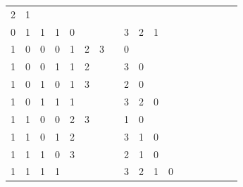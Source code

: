 \begin{table}[htbp]
\begin{minipage}{.4\textwidth}
\begin{tabular}{cccccccccccccccccc}
			\multicolumn{1}{c}{2} & \multicolumn{1}{c}{1} & \multicolumn{1}{c}{}& \multicolumn{1}{c}{} \\
			\multicolumn{1}{c}{0} & \multicolumn{1}{c}{1} & \multicolumn{1}{c}{1} & \multicolumn{1}{c}{1} & \multicolumn{1}{|c}{0} & \multicolumn{1}{c}{} & \multicolumn{1}{c}{}& \multicolumn{1}{c}{} &
			\multicolumn{1}{c}{3} & \multicolumn{1}{c}{2} & \multicolumn{1}{c}{1}& \multicolumn{1}{c}{} \\
			\multicolumn{1}{c}{1} & \multicolumn{1}{c}{0} & \multicolumn{1}{c}{0} & \multicolumn{1}{c}{0} & \multicolumn{1}{|c}{1} & \multicolumn{1}{c}{2} & \multicolumn{1}{c}{3}& \multicolumn{1}{c}{} &
			\multicolumn{1}{c}{0} & \multicolumn{1}{c}{} & \multicolumn{1}{c}{}& \multicolumn{1}{c}{} \\
			\multicolumn{1}{c}{1} & \multicolumn{1}{c}{0} & \multicolumn{1}{c}{0} & \multicolumn{1}{c}{1} & \multicolumn{1}{|c}{1} & \multicolumn{1}{c}{2} & \multicolumn{1}{c}{}& \multicolumn{1}{c}{} &
			\multicolumn{1}{c}{3} & \multicolumn{1}{c}{0} & \multicolumn{1}{c}{}& \multicolumn{1}{c}{} \\
			\multicolumn{1}{c}{1} & \multicolumn{1}{c}{0} & \multicolumn{1}{c}{1} & \multicolumn{1}{c}{0} & \multicolumn{1}{|c}{1} & \multicolumn{1}{c}{3} & \multicolumn{1}{c}{}& \multicolumn{1}{c}{} &
			\multicolumn{1}{c}{2} & \multicolumn{1}{c}{0} & \multicolumn{1}{c}{}& \multicolumn{1}{c}{} \\
			\multicolumn{1}{c}{1} & \multicolumn{1}{c}{0} & \multicolumn{1}{c}{1} & \multicolumn{1}{c}{1} & \multicolumn{1}{|c}{1} & \multicolumn{1}{c}{} & \multicolumn{1}{c}{}& \multicolumn{1}{c}{} &
			\multicolumn{1}{c}{3} & \multicolumn{1}{c}{2} & \multicolumn{1}{c}{0}& \multicolumn{1}{c}{} \\
			\multicolumn{1}{c}{1} & \multicolumn{1}{c}{1} & \multicolumn{1}{c}{0} & \multicolumn{1}{c}{0} & \multicolumn{1}{|c}{2} & \multicolumn{1}{c}{3} & \multicolumn{1}{c}{}& \multicolumn{1}{c}{} &
			\multicolumn{1}{c}{1} & \multicolumn{1}{c}{0} & \multicolumn{1}{c}{}& \multicolumn{1}{c}{} \\
			\multicolumn{1}{c}{1} & \multicolumn{1}{c}{1} & \multicolumn{1}{c}{0} & \multicolumn{1}{c}{1} & \multicolumn{1}{|c}{2} & \multicolumn{1}{c}{} & \multicolumn{1}{c}{}& \multicolumn{1}{c}{} &
			\multicolumn{1}{c}{3} & \multicolumn{1}{c}{1} & \multicolumn{1}{c}{0}& \multicolumn{1}{c}{} \\
			\multicolumn{1}{c}{1} & \multicolumn{1}{c}{1} & \multicolumn{1}{c}{1} & \multicolumn{1}{c}{0} & \multicolumn{1}{|c}{3} & \multicolumn{1}{c}{} & \multicolumn{1}{c}{}& \multicolumn{1}{c}{} &
			\multicolumn{1}{c}{2} & \multicolumn{1}{c}{1} & \multicolumn{1}{c}{0}& \multicolumn{1}{c}{} \\
			\multicolumn{1}{c}{1} & \multicolumn{1}{c}{1} & \multicolumn{1}{c}{1} & \multicolumn{1}{c}{1} & \multicolumn{1}{|c}{} & \multicolumn{1}{c}{} & \multicolumn{1}{c}{}& \multicolumn{1}{c}{} &
			\multicolumn{1}{c}{3} & \multicolumn{1}{c}{2} & \multicolumn{1}{c}{1}& \multicolumn{1}{c}{0} \\
			

\end{tabular}
\end{minipage}
\end{table}

